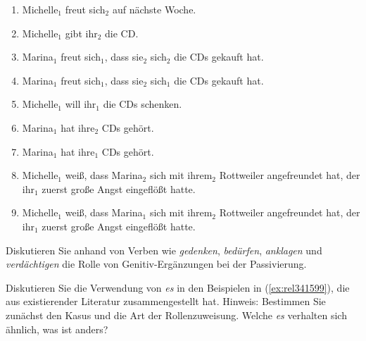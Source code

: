 \begin{enumerate}\Lf
  \item Michelle$_{\textrm{1}}$ freut sich$_{\textrm{2}}$ auf nächste Woche.
  \item Michelle$_{\textrm{1}}$ gibt ihr$_{\textrm{2}}$ die CD.
  \item Marina$_{\textrm{1}}$ freut sich$_{\textrm{1}}$, dass sie$_{\textrm{2}}$ sich$_{\textrm{2}}$ die CDs gekauft hat.
  \item Marina$_{\textrm{1}}$ freut sich$_{\textrm{1}}$, dass sie$_{\textrm{2}}$ sich$_{\textrm{1}}$ die CDs gekauft hat.
  \item Michelle$_{\textrm{1}}$ will ihr$_{\textrm{1}}$ die CDs schenken.
  \item Marina$_{\textrm{1}}$ hat ihre$_{\textrm{2}}$ CDs gehört.
  \item Marina$_{\textrm{1}}$ hat ihre$_{\textrm{1}}$ CDs gehört.
  \item Michelle$_{\textrm{1}}$ weiß, dass Marina$_{\textrm{2}}$ sich mit ihrem$_{\textrm{2}}$ Rottweiler angefreundet hat, der ihr$_{\textrm{1}}$ zuerst große Angst eingeflößt hatte.
  \item Michelle$_{\textrm{1}}$ weiß, dass Marina$_{\textrm{1}}$ sich mit ihrem$_{\textrm{2}}$ Rottweiler angefreundet hat, der ihr$_{\textrm{1}}$ zuerst große Angst eingeflößt hatte.
\end{enumerate}

\Uebung[\tristar] \label{u1310} Diskutieren Sie anhand von Verben wie \textit{gedenken}, \textit{bedürfen}, \textit{anklagen} und \textit{verdächtigen} die Rolle von Genitiv-Ergänzungen bei der Passivierung.

\Uebung[\tristar] \label{u1311} Diskutieren Sie die Verwendung von \textit{es} in den Beispielen in (\ref{ex:rel341599}), die \cite[51]{Mueller08} aus existierender Literatur zusammengestellt hat.
Hinweis: Bestimmen Sie zunächst den Kasus und die Art der Rollenzuweisung.
Welche \textit{es} verhalten sich ähnlich, was ist anders?

\begin{exe}
  \ex\label{ex:rel341599} 
  \begin{xlist}
  \end{xlist}
\end{exe}

